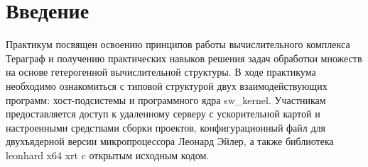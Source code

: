 \section*{Введение}
{}
Практикум посвящен освоению принципов работы вычислительного комплекса Тераграф и получению практических навыков решения задач обработки множеств на основе гетерогенной вычислительной структуры. В ходе практикума необходимо ознакомиться с типовой структурой двух взаимодействующих программ: хост-подсистемы и программного ядра sw\_kernel. Участникам предоставляется доступ к удаленному серверу с ускорительной картой и настроенными средствами сборки проектов, конфигурационный файл для двухъядерной версии микропроцессора Леонард Эйлер, а также библиотека leonhard x64 xrt c открытым исходным кодом.

\newpage